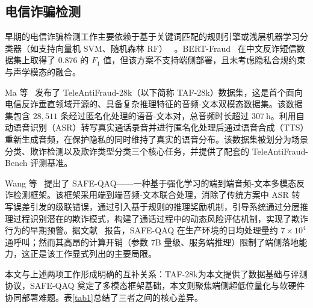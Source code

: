 \documentclass[11pt, a4paper]{article}
\begin{document}
\subsection{电信诈骗检测}
早期的电信诈骗检测工作主要依赖于基于关键词匹配的规则引擎或浅层机器学习分类器（如支持向量机 SVM、随机森林 RF）~\cite{13,14,15} 。BERT-Fraud~\cite{16} 在中文反诈短信数据集上取得了 $0.876$ 的 $F_1$ 值，但该方案不支持端侧部署，且未考虑隐私合规约束与声学模态的融合。

Ma 等~\cite{1} 发布了 TeleAntiFraud-28k（以下简称 TAF-28k）数据集，这是首个面向电信反诈垂直领域开源的、具备复杂推理特征的音频-文本双模态数据集。该数据集包含 $28,511$ 条经过匿名化处理的语音-文本对，总音频时长超过 $307~\text{h}$。利用自动语音识别（ASR）转写真实通话录音并进行匿名化处理后通过语音合成（TTS）重新生成音频，在保护隐私的同时维持了真实的语音分布。该数据集被划分为场景分类、欺诈检测以及欺诈类型分类三个核心任务，并提供了配套的 TeleAntiFraud-Bench 评测基准。

Wang 等~\cite{2} 提出了 SAFE-QAQ——一种基于强化学习的端到端音频-文本多模态反诈检测框架。该框架采用端到端音频-文本联合处理，消除了传统方案中 ASR 转写误差引发的级联错误，通过引入基于规则的推理奖励机制，引导系统通过分层推理过程识别潜在的欺诈模式，构建了通话过程中的动态风险评估机制，实现了欺诈行为的早期预警。据文献~\cite{2} 报告，SAFE-QAQ 在生产环境的日均处理量约 $7\times10^4$ 通呼叫；然而其高昂的计算开销（参数 7B 量级、服务端推理）限制了端侧落地能力，这正是该工作显式列出的主要局限。

本文与上述两项工作形成明确的互补关系：TAF-28k为本文提供了数据基础与评测协议，SAFE-QAQ 奠定了多模态框架基础，本文则聚焦端侧超低位量化与软硬件协同部署难题。表\ref{tab1}总结了三者之间的核心差异。
\end{document}
